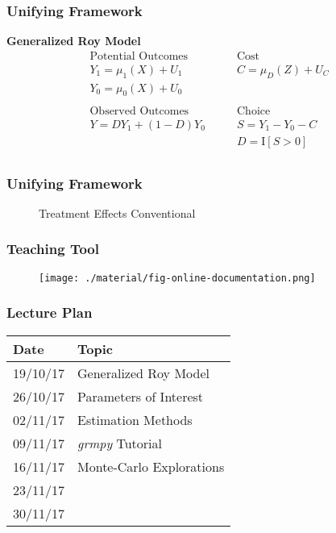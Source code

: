 %
\begin{frame}
\frametitle{Unifying Framework}
\textbf{Generalized Roy Model}
\begin{align*}
\text{Potential Outcomes} &\qquad \text{Cost} \\
Y_1 = \mu_1(X) + U_1      &\qquad C = \mu_D(Z) + U_C \\
Y_0 = \mu_0(X) + U_0      &\qquad \\
    & \\
\text{Observed Outcomes} &\qquad \text{Choice} \\
Y = D Y_1 + (1 - D)Y_0 &\qquad S = Y_1 - Y_0 - C \\
                       &\qquad D = \mathrm{I}[S > 0] \\
\end{align*}

\end{frame}

\begin{frame}
\frametitle{Unifying Framework}
\begin{figure}[htp]\centering
\caption{Treatment Effects Conventional}\label{Treatment Effects Conventional}
\end{figure}
\end{frame}


\begin{frame}
\frametitle{Teaching Tool}
\begin{figure}[htp]\centering
\texttt{[image: ./material/fig-online-documentation.png]}
\end{figure}
\end{frame}
    


\begin{frame}
\frametitle{Lecture Plan}
\begin{longtable}[]{@{}ll@{}}
\toprule
Date & Topic\tabularnewline
\midrule
\endhead
19/10/17 & Generalized Roy Model\tabularnewline
26/10/17 & Parameters of Interest\tabularnewline
02/11/17 & Estimation Methods\tabularnewline
09/11/17 & \emph{grmpy} Tutorial\tabularnewline
16/11/17 & Monte-Carlo Explorations\tabularnewline
23/11/17 &\tabularnewline
30/11/17 &\tabularnewline
\bottomrule
\end{longtable}
    
\end{frame}



